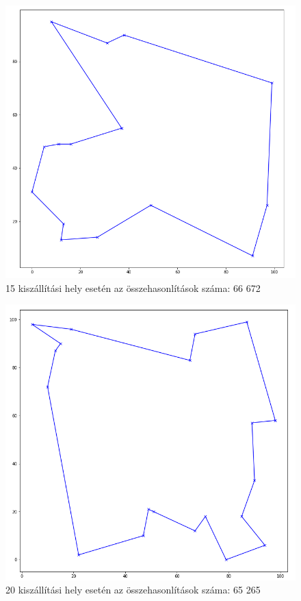 \begin{figure}[h!]
\centering
\includegraphics[scale=0.4]{images/15.png}
\caption{15 kiszállítási hely esetén az összehasonlítások száma: 66 672}
\label{fig:tsp15location}
\end{figure}

\begin{figure}[h!]
\centering
\includegraphics[scale=0.4]{images/20.png}
\caption{20 kiszállítási hely esetén az összehasonlítások száma: 65 265}
\label{fig:tsp20location}
\end{figure}

